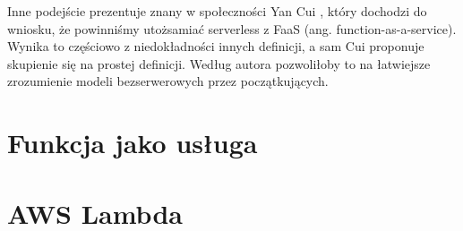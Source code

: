 Inne podejście prezentuje znany w społeczności Yan Cui \cite{cui2024serverless}, który dochodzi do wniosku, że powinniśmy utożsamiać serverless z FaaS (ang. function-as-a-service).
Wynika to częściowo z niedokładności innych definicji, a sam Cui proponuje skupienie się na prostej definicji.
Według autora pozwoliłoby to na łatwiejsze zrozumienie modeli bezserwerowych przez początkujących.


\section{Funkcja jako usługa}\label{chapter:funkcja_jako_usluga}

\section{AWS Lambda}\label{chapter:aws_lambda}

